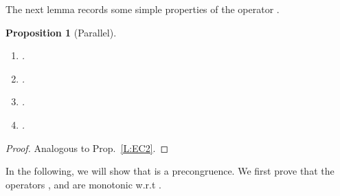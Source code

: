 \documentclass{elsarticle}
\theoremstyle{plain}
\newtheorem{proposition}[theorem]{Proposition}
\theoremstyle{definition}
\begin{document}
The next lemma records some simple properties of the operator .

\begin{proposition}[Parallel]\label{S:PARALLEL}\hfill
    \begin{enumerate}
      \item .
      \item .
      \item .
      \item .
\end{enumerate}
\end{proposition}
\begin{proof}
  Analogous to Prop.~\ref{L:EC2}.
\end{proof}

In the following, we will show that  is a precongruence.
We first prove that the operators ,  and  are monotonic w.r.t .
\end{document}
